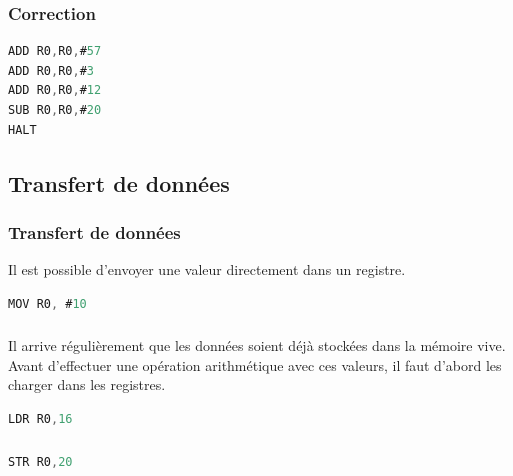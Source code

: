 \documentclass[svgnames,11pt]{beamer}
\begin{document}
\begin{frame}[fragile]
    \frametitle{Correction}

    \begin{center}
        \begin{lstlisting}[language=C , basicstyle=\small, xleftmargin=2em, xrightmargin=2em]
ADD R0,R0,#57
ADD R0,R0,#3
ADD R0,R0,#12
SUB R0,R0,#20
HALT
\end{lstlisting}
        \label{CODE}
    \end{center}

\end{frame}
\subsection{Transfert de données}
\begin{frame}[fragile]
    \frametitle{Transfert de données}
Il est possible d'envoyer une valeur directement dans un registre.
\begin{center}
\begin{lstlisting}[language=C , basicstyle=\small, xleftmargin=2em, xrightmargin=2em]
MOV R0, #10
\end{lstlisting}
\label{CODE}
\end{center}
    

\end{frame}
\begin{frame}[fragile]
    \frametitle{}

    Il arrive régulièrement que les données soient déjà stockées dans la mémoire vive. Avant d'effectuer une opération arithmétique avec ces valeurs, il faut d'abord les charger dans les registres.
    \begin{center}
        \begin{lstlisting}[language=C , basicstyle=\small, xleftmargin=2em, xrightmargin=2em]
LDR R0,16
\end{lstlisting}
        \label{CODE}
    \end{center}
\end{frame}
\begin{frame}[fragile]
    \frametitle{}

    \begin{center}
        \begin{lstlisting}[language=C , basicstyle=\small, xleftmargin=2em, xrightmargin=2em]
STR R0,20
\end{lstlisting}
        \label{CODE}
    \end{center}

\end{frame}
\end{document}
